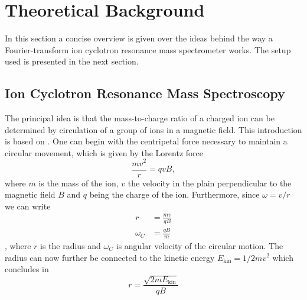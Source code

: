 \documentclass[a4paper,10pt]{article}
\begin{document}
\section{Theoretical Background}
\label{sec_theory}
In this section a concise overview is given over the ideas behind the way a Fourier-transform ion cyclotron resonance mass spectrometer works. The setup used is presented in the next section. 

\subsection{Ion Cyclotron Resonance Mass Spectroscopy}
The principal idea is that the mass-to-charge ratio of a charged ion can be determined by circulation of a group of ions in a magnetic field. This introduction is based on \cite{primer}. One can begin with the centripetal force necessary to maintain a circular movement, which is given by the Lorentz force
\begin{equation}
	\frac{m v^2}{r} = q v B,
\end{equation}
where $m$ is the mass of the ion, $v$ the velocity in the plain perpendicular to the magnetic field $B$ and $q$ being the charge of the ion. Furthermore, since $\omega = v/r$ we can write 
\begin{equation}
	\label{omega}
	\begin{split}
		r &= \frac{m v}{q B} \\
		\omega_C &= \frac{q B}{m}
	\end{split}
\end{equation},
where $r$ is the radius and $\omega_C$ is angular velocity of the circular motion. The radius can now further be connected to the kinetic energy $E_\mathrm{kin} = 1/2 m v^2$ which concludes in 
\begin{equation}
	r = \frac{\sqrt{2 m E_\mathrm{kin}}}{qB} 
\end{equation}
\end{document}
